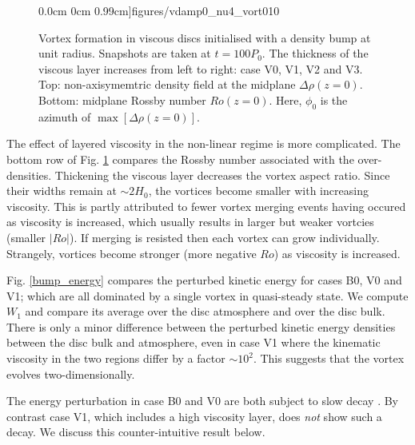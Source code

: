 \begin{figure}
     0.0cm 0cm
     0.99cm]{figures/vdamp0_nu4_vort010}
   \caption{Vortex formation in viscous discs initialised with
     a density bump at unit radius. Snapshots are taken at $t=100P_0$. The
     thickness of the viscous layer increases from left to 
     right: case V0, V1, V2 and V3.   
     Top: non-axisymemtric density field at the midplane
     $\Delta\rho(z=0)$. Bottom: midplane Rossby number
     $Ro(z=0)$. Here, $\phi_0$ is the azimuth of $\max[\Delta\rho(z=0)]$. 
     \label{vdamp0}
   }
\end{figure}


The effect of layered viscosity in the non-linear regime is more
complicated. The bottom row of Fig. \ref{vdamp0} compares the Rossby number
associated with the over-densities. Thickening the viscous 
layer decreases the vortex aspect ratio. Since their widths remain
at $\sim 2H_0$, the vortices become smaller with increasing
viscosity. This is partly attributed to fewer vortex merging
events having occured as viscosity is increased, which 
usually results in larger but weaker vortcies (smaller
$|Ro|$). If merging is resisted then each vortex can grow individually.  
Strangely, vortices become stronger  (more negative $Ro$) as viscosity
is increased. 

Fig. \ref{bump_energy} compares the perturbed kinetic energy for 
cases B0, V0 and V1; which are all dominated by a single vortex in 
quasi-steady state. We compute $W_1$ and compare its
average over the disc atmosphere and over the 
disc bulk. There is only a minor difference between the
perturbed kinetic energy densities between the disc bulk and
atmosphere, even in case V1 where the kinematic viscosity in the two
regions differ by a factor $\sim10^2$. This suggests that the
vortex evolves two-dimensionally. 

The energy perturbation in case B0 and V0 are both subject to
slow decay \citep[a result also observed by][]{meheut12}.  
By contrast case V1, which includes a high viscosity layer, does
\emph{not} show such a decay. We discuss this counter-intuitive result
below.  


